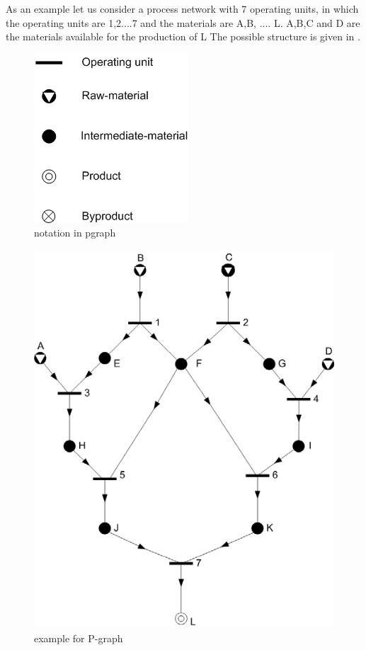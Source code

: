 As an example let us consider a process network with 7 operating units, in which the operating units are 1,2....7 and the materials are A,B, .... L. A,B,C and D are the materials available for the production of L The possible structure is given in  .

\begin{figure}[th]
	\centering
		\includegraphics{chapiter2/img/notationP}
	\caption{\label{fig:notation in pgraph}notation in pgraph}
\end{figure}


\begin{figure}[th]
	\centering
		\includegraphics{chapiter2/img/examplePgraph}
	\caption{\label{fig:example for P-graph}example for P-graph }
\end{figure}

